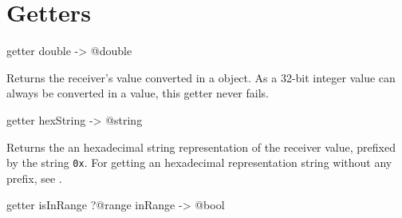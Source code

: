 \section{Getters}


\begin{galgascode}
getter double -> @double
\end{galgascode}

Returns the receiver's value converted in a  object. As a 32-bit integer value can always be converted in a  value, this getter never fails.




\begin{galgascode}
getter hexString -> @string
\end{galgascode}

Returns the an hexadecimal string representation of the receiver value, prefixed by the string \texttt{0x}. For getting an hexadecimal representation string without any prefix, see .




\begin{galgascode}
getter isInRange ?@range inRange -> @bool
\end{galgascode}

